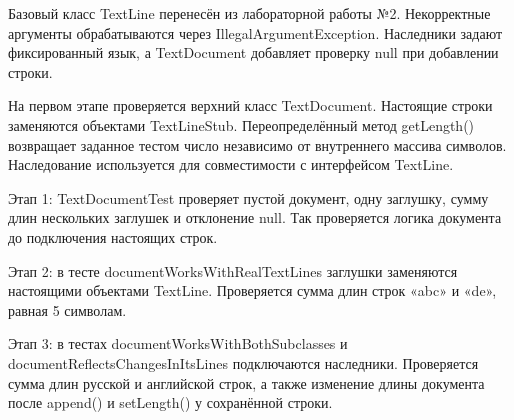 \documentclass{mietlab}
\begin{document}

Базовый класс TextLine перенесён из лабораторной работы №2. Некорректные аргументы обрабатываются через IllegalArgumentException. Наследники задают фиксированный язык, а TextDocument добавляет проверку null при добавлении строки.\par

\Needspace{156bp}


\Needspace{156bp}


\Needspace{156bp}


\Needspace{156bp}



На первом этапе проверяется верхний класс TextDocument. Настоящие строки заменяются объектами TextLineStub. Переопределённый метод getLength() возвращает заданное тестом число независимо от внутреннего массива символов. Наследование используется для совместимости с интерфейсом TextLine.\par

\Needspace{156bp}


Этап 1: TextDocumentTest проверяет пустой документ, одну заглушку, сумму длин нескольких заглушек и отклонение null. Так проверяется логика документа до подключения настоящих строк.\par

Этап 2: в тесте documentWorksWithRealTextLines заглушки заменяются настоящими объектами TextLine. Проверяется сумма длин строк «abc» и «de», равная 5 символам.\par

\begin{sloppypar}
Этап 3: в тестах documentWorksWithBothSubclasses и documentReflectsChangesInItsLines подключаются наследники. Проверяется сумма длин русской и английской строк, а также изменение длины документа после append() и setLength() у сохранённой строки.\par
\end{sloppypar}
\end{document}
